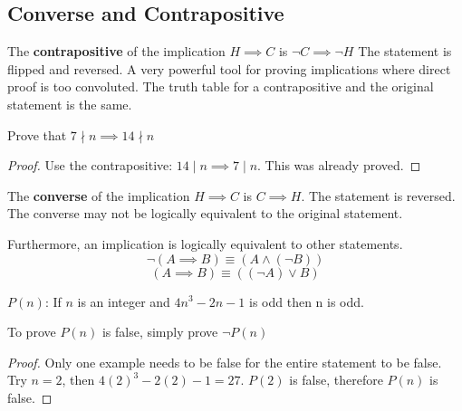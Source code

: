 \documentclass[english, 12pt]{article}
\begin{document}
\subsection{Converse and Contrapositive}
\begin{defn}
The \textbf{contrapositive} of the implication $H \implies C$ is $\lnot C \implies \lnot H$ The statement is flipped and reversed. A very powerful tool for proving implications where direct proof is too convoluted. The truth table for a contrapositive and the original statement is the same.
\end{defn}
\begin{exmp}
Prove that $7 \nmid n \implies 14 \nmid n$
\begin{proof}
Use the contrapositive: $14 \mid n \implies 7 \mid n$. This was already proved. 
\end{proof}
\end{exmp}
\begin{defn}
The \textbf{converse} of the implication $H \implies C$ is $C \implies H$. The statement is reversed. The converse may not be logically equivalent to the original statement.
\end{defn}
\begin{thrm}
Furthermore, an implication is logically equivalent to other statements.
\[ \lnot(A \implies B) \equiv (A \land (\lnot B)) \]
\[ (A \implies B) \equiv ((\lnot A) \lor B) \]
\end{thrm}
\begin{exmp}
$P(n)$: If $n$ is an integer and $4n^3 - 2n - 1$ is odd then n is odd.
\begin{note}
To prove $P(n)$ is false, simply prove $\lnot P(n)$
\end{note}
\begin{proof}
Only one example needs to be false for the entire statement to be false. Try $ n = 2$, then $4(2)^3 - 2(2) - 1 = 27$. $P(2)$ is false, therefore $P(n)$ is false.
\end{proof}
\end{exmp}
\end{document}
